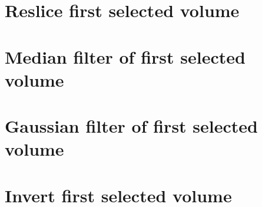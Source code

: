 \section{Reslice first selected volume}

\section{Median filter of first selected volume}

\section{Gaussian filter of first selected volume}

\section{Invert first selected volume}

